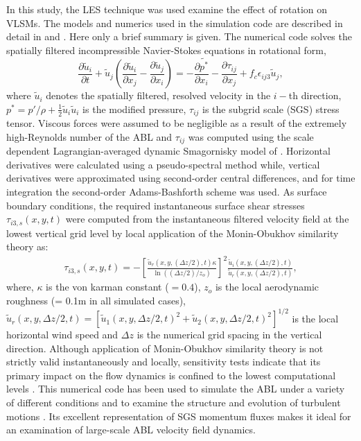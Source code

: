 \documentclass{amsart}
\begin{document}
In this study, the LES technique was used examine the effect of rotation on VLSMs. The models and numerics used in the simulation code are described in detail in \citet{stoll_wrr_2006} and \citet{stoll_blm_2008}.  Here only a brief summary is given.  The numerical code solves the spatially filtered incompressible Navier-Stokes equations in rotational form,
\begin{equation}
    \frac{\partial \tilde{u}_i}{\partial t}+ \tilde{u}_j\left(\frac{\partial \tilde{u}_i}{\partial x_{j}} -\frac{\partial \tilde{u}_j}{\partial x_{i}} \right)  = -\frac{\partial \tilde{p^*}}{\partial x_i}-\frac{\partial \tau_{ij}}{\partial x_j}+f_{c}\epsilon_{ij3}\tilde{u}_{j},  
\label{eqn:les_eqn}
\end{equation}
\noindent where $\tilde{u}_i$ denotes the spatially filtered, resolved velocity in the $i-$th direction, $p^{*}=p'/\rho + \frac{1}{2}\tilde{u}_i\tilde{u}_i$ is the modified pressure, $\tau_{ij}$ is the subgrid scale (SGS) stress tensor. Viscous forces were assumed to be negligible as a result of the extremely high-Reynolds number of the ABL and $\tau_{ij}$ was computed using the scale dependent Lagrangian-averaged dynamic Smagornisky model of \citet{stoll_wrr_2006}. Horizontal derivatives were calculated using a pseudo-spectral method while, vertical derivatives were approximated using second-order central differences, and for time integration the second-order Adams-Bashforth scheme was used. As surface boundary conditions, the required instantaneous surface shear stresses $\tau_{i3,s}(x,y,t)$  were computed from the instantaneous filtered velocity field at the lowest vertical grid level by local application of the Monin-Obukhov similarity theory \citep{stoll_blm_2006} as:
\begin{align}
\tau_{i3,s}(x,y,t) = -\left [ \frac{\tilde{u}_r(x,y,(\Delta z/2),t)\kappa}{\ln((\Delta z/2)/z_o)} \right ]^2\frac{\tilde{u}_i(x,y,(\Delta z/2),t)}{\tilde{u}_r(x,y,(\Delta z/2),t)}, 
\end{align}
\noindent where, $\kappa$ is the von karman constant ($=0.4$), $z_o$ is the local aerodynamic roughness (= 0.1m in all simulated cases), $\tilde{u}_r(x,y,\Delta z/2,t)=[\tilde{u}_1(x,y,\Delta z/2,t)^{2}+\tilde{u}_2(x,y,\Delta z/2,t)^{2}]^{1/2}$ is the local horizontal wind speed and $\Delta z$ is the numerical grid spacing in the vertical direction. Although application of Monin-Obukhov similarity theory is not strictly valid instantaneously and locally, sensitivity tests indicate that its primary impact on the flow dynamics is confined to the lowest computational levels \citep{stoll_blm_2006}. This numerical code has been used to simulate the ABL under a variety of different conditions \citep[e.g.,][]{stoll_jas_2009,bailey_blm_2013,miller_blm_2013} and to examine the structure and evolution of turbulent motions \citep[e.g.,][]{bailey_ae_2014,bailey_jfm_2016}.  Its excellent representation of SGS momentum fluxes \citep{stoll_wrr_2006} makes it ideal for an examination of large-scale ABL velocity field dynamics.
\end{document}
